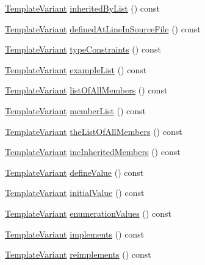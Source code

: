 \begin{DoxyCompactItemize}
\hyperlink{class_template_variant}{Template\+Variant} \hyperlink{class_translate_context_1_1_private_accfaa28d67e72a4f976ca393d09aecac}{inherited\+By\+List} () const 
\item 
\hyperlink{class_template_variant}{Template\+Variant} \hyperlink{class_translate_context_1_1_private_a561c216554a1af071628d3f3ed5ba6c5}{defined\+At\+Line\+In\+Source\+File} () const 
\item 
\hyperlink{class_template_variant}{Template\+Variant} \hyperlink{class_translate_context_1_1_private_a464eeac436386b9a148abdf8b4508cfe}{type\+Constraints} () const 
\item 
\hyperlink{class_template_variant}{Template\+Variant} \hyperlink{class_translate_context_1_1_private_aefc3a186d2ddeb2611ec88f510968b7e}{example\+List} () const 
\item 
\hyperlink{class_template_variant}{Template\+Variant} \hyperlink{class_translate_context_1_1_private_af55472363895d868e7fda54950ed4336}{list\+Of\+All\+Members} () const 
\item 
\hyperlink{class_template_variant}{Template\+Variant} \hyperlink{class_translate_context_1_1_private_adc71187ee535b8ac2ff3980ee1df2b70}{member\+List} () const 
\item 
\hyperlink{class_template_variant}{Template\+Variant} \hyperlink{class_translate_context_1_1_private_a48adf0bd5d54eff86a2f4fa8a4196f85}{the\+List\+Of\+All\+Members} () const 
\item 
\hyperlink{class_template_variant}{Template\+Variant} \hyperlink{class_translate_context_1_1_private_af10520d16e1af93653ffe6fb2432cf13}{inc\+Inherited\+Members} () const 
\item 
\hyperlink{class_template_variant}{Template\+Variant} \hyperlink{class_translate_context_1_1_private_a13514e4b4f13c71215ddbc933c68ff95}{define\+Value} () const 
\item 
\hyperlink{class_template_variant}{Template\+Variant} \hyperlink{class_translate_context_1_1_private_a321f739f298f5ea853906e2997e94947}{initial\+Value} () const 
\item 
\hyperlink{class_template_variant}{Template\+Variant} \hyperlink{class_translate_context_1_1_private_ad6d90649ac5b27370c817a142df4cfd0}{enumeration\+Values} () const 
\item 
\hyperlink{class_template_variant}{Template\+Variant} \hyperlink{class_translate_context_1_1_private_abf9776873d59bbbb55338715a64e4332}{implements} () const 
\item 
\hyperlink{class_template_variant}{Template\+Variant} \hyperlink{class_translate_context_1_1_private_ae9bc36dc4d626e288e2357acf68e1d3b}{reimplements} () const 

\end{DoxyCompactItemize}
